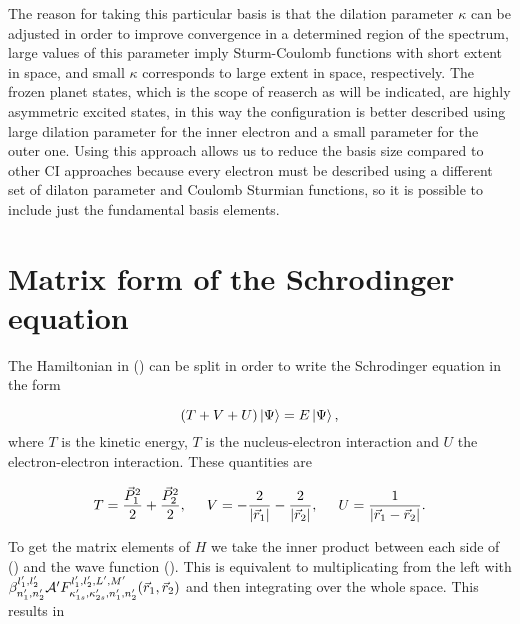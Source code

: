 The reason for taking this particular basis is that the dilation parameter $ \kappa $ can be adjusted in order to improve convergence in a determined region of the spectrum, large values of this parameter imply Sturm-Coulomb functions with short extent in space, and small $ \kappa $ corresponds to large extent in space, respectively. The frozen planet states, which is the scope of reaserch as will be indicated, are highly asymmetric excited states, in this way the configuration is better described using large dilation parameter for the inner electron and a small parameter for the outer one. Using this approach allows us to reduce the basis size compared to other CI approaches because every electron must be described using a different set of dilaton parameter and Coulomb Sturmian functions, so it is possible to include just the fundamental basis elements.
 
\section{Matrix form of the Schrodinger equation}

The Hamiltonian in () can be split in order to write the Schrodinger equation in the form 

\begin{equation}
	(T+V+U)\ket{\Psi}=E\ket{\Psi},
\end{equation}
where $ T $ is the kinetic energy, $ T $ is the nucleus-electron interaction and $ U $ the electron-electron interaction. These quantities are

\begin{equation}
	T=\frac{\vec{P}_{1}^{2}}{2}+\frac{\vec{P}_{2}^{2}}{2}, \hspace{0.5cm} V=-\frac{2}{\abs{\vec{r}_{1}}}-\frac{2}{\abs{\vec{r}_{2}}}, \hspace{0.5cm} U=\frac{1}{\abs{\vec{r}_{1}-\vec{r}_{2}}}.
\end{equation}

To get the matrix elements of $ H $ we take the inner product between each side of () and the wave function (). This is equivalent to multiplicating from the left with $ \beta_{n_{1}^{\prime},n_{2}^{\prime}}^{l_{1}^{\prime},l_{2}^{\prime}} {\cal A^{\prime}}  F_{\kappa_{1s}^{\prime}, \kappa_{2s}^{\prime},n_{1}^{\prime},n_{2}^{\prime}}^{l_{1}^{\prime},l_{2}^{\prime},L^{\prime},M^{\prime}}(\vec{r}_{1},\vec{r}_{2})  $ and then integrating over the whole space. This results in

